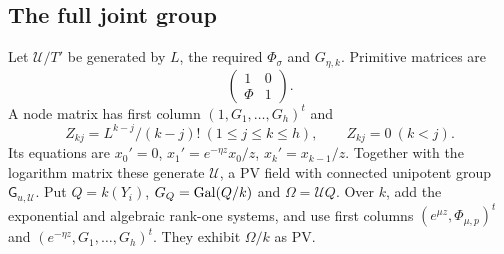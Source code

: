 \subsection{The full joint group}
Let $\mathcal U/T'$ be generated by $L$, the required $\Phi_\sigma$ and
$G_{\eta,k}$. Primitive matrices are
\[
 \begin{pmatrix}1&0\\\Phi&1\end{pmatrix}.
\]
A node matrix has first column $(1,G_1,\ldots,G_h)^t$ and
\begin{equation}\label{eq:core-unipotent-matrix}
Z_{kj}=L^{k-j}/(k-j)!\ (1\le j\le k\le h),\qquad Z_{kj}=0\ (k<j).
\end{equation}
Its equations are $x_0'=0$, $x_1'=e^{-\eta z}x_0/z$, $x_k'=x_{k-1}/z$.
Together with the logarithm matrix these generate $\mathcal U$, a PV field
with connected unipotent group $\mathsf G_{u,\mathcal U}$. Put $Q=k(Y_i)$,
$G_Q=\operatorname{Gal}(Q/k)$ and $\Omega=\mathcal U Q$. Over $k$, add the exponential
and algebraic rank-one systems, and use first columns
$(e^{\mu z},\Phi_{\mu,p})^t$ and $(e^{-\eta z},G_1,\ldots,G_h)^t$.
They exhibit $\Omega/k$ as PV.

